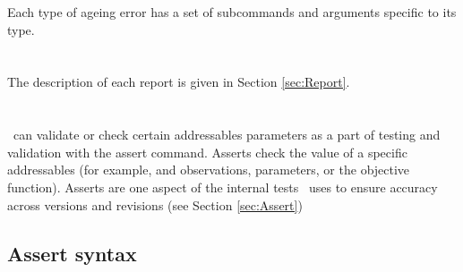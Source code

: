 Each type of ageing error has a set of subcommands and arguments specific to its type.


\fi %
%

 \pagebreak 
 \section{\label{syntax:Reports}}

The description of each report is given in Section \ref{sec:Report}.

\subsection{}



 \pagebreak 
 \section{\label{syntax:General}}



 \pagebreak 
 \section{}\label{syntax:Assert}

\CNAME\ can validate or check certain addressables parameters as a part of testing and validation with the assert command. Asserts check the value of a specific addressables (for example, and observations, parameters, or the objective function). Asserts are one aspect of the internal tests \CNAME\ uses to ensure accuracy across versions and revisions (see Section \ref{sec:Assert})

\subsection{Assert syntax}



